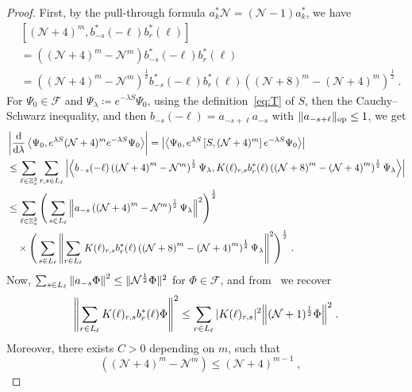 \documentclass[12pt,a4paper]{article}
\numberwithin{equation}{section}
\newcommand{\cF}{\mathcal{F}}
\newcommand{\cN}{\mathcal{N}}
\newcommand{\1}{\mathbb{I}}
\newcommand{\di}{\textnormal{d}}
\newcommand{\Ncal}{\mathcal{N}}
\newcommand{\NN}{\mathcal{N}}
\newcommand{\half}{\frac{1}{2}}
\newcommand{\eva}[1]{\left\langle #1 \right\rangle}
\theoremstyle{plain}
\theoremstyle{definition}
\theoremstyle{remark}
\theoremstyle{plain}
\theoremstyle{definition}
\theoremstyle{remark}
\begin{document}
\begin{proof}
First, by the pull-through formula $a^*_k \Ncal = (\Ncal - 1) a^*_k$, we have
\begin{align}
	& \left[(\NN+4)^m, b^*_{-s}(-\ell)b^*_{r}(\ell)\right] \nonumber\\
	&= \left( (\NN+4)^m - \NN^m \right) b^*_{-s}(-\ell)b^*_{r}(\ell) \nonumber\\
	&= \left( \left(\NN+4\right)^m - \NN^m \right)^\half b^*_{-s}(-\ell)b^*_{r}(\ell) \left( \left(\NN+8\right)^m - \left(\NN+4\right)^m \right)^\half \;.
\end{align}
For $ \Psi_0 \in \cF $ and $ \Psi_\lambda \coloneq e^{-\lambda S} \Psi_0 $, using the definition~\eqref{eq:T} of $ S $, then the Cauchy--Schwarz inequality, and then $ b_{-s}(-\ell) = a_{-s+\ell} a_{-s} $ with $ \Vert a_{-s+\ell} \Vert_{\textnormal{op}} \le 1 $, we get
\begin{align*}
	&\left|\frac{\di}{\di\lambda}\eva{\Psi_0, e^{\lambda S} (\mathcal{N}+4)^m e^{-\lambda S} \Psi_0 }\right|
	= \left| \eva{\Psi_0, e^{\lambda S} \left[S, (\NN+4)^m\right] e^{-\lambda S} \Psi_0}\right|\nonumber\\
	&\leq \sum_{\ell\in \mathbb{Z}^3_*}
		\sum_{r,s\in L_\ell} \abs{\eva{ b_{-s}(-\ell) \left( \left(\NN+4\right)^m - \NN^m \right)^\half \Psi_\lambda, K(\ell)_{r,s} b^*_{r}(\ell) \left( \left(\NN+8\right)^m - \left(\NN+4\right)^m \right)^\half \Psi_\lambda }}\nonumber\\
	&\leq \sum_{\ell\in \mathbb{Z}^3_*}
		\Bigg( \sum_{s\in L_\ell} \norm{ a_{-s} \left( \left(\NN+4\right)^m - \NN^m \right)^\half \Psi_\lambda}^2 \Bigg)^{\half} \nonumber\\
		&\quad \times \Bigg( \sum_{s\in L_\ell}
			\norm { \sum_{r\in L_\ell} K(\ell)_{r,s} b^*_{r}(\ell) \left( \left(\NN+8\right)^m - \left(\NN+4\right)^m \right)^\half \Psi_\lambda}^2 \Bigg)^{\half} \;. \nonumber\\
\end{align*}
Now, $ \sum_{s \in L_\ell} \norm{a_{-s} \Phi}^2 \leq \Vert \cN^{\half} \Phi \Vert^2 $ for $ \Phi \in \cF $, and from~\cite[Prop.~4.2]{CHN21} we recover
\begin{equation}
	\norm{\sum_{r\in L_\ell} K(\ell)_{r,s} b^*_{r}(\ell) \Phi}^2
	\le \sum_{r\in L_\ell} |K(\ell)_{r,s}|^2
		\norm{(\cN + 1)^{\half} \Phi}^2 \;.
\end{equation}
Moreover, there exists $ C > 0 $ depending on $ m $, such that
\begin{equation}
	\left( \left(\NN+4\right)^m - \NN^m \right)
	\leq \left(\NN+4\right)^{m-1} \;, \quad

\end{equation}
\end{proof}
\end{document}
